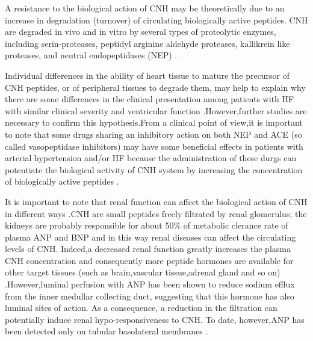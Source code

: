 \documentclass[14pt,a4paper,onecolumn]{extarticle}
\begin{document}
A resistance to the biological action of CNH may be theoretically due to an increase in degradation (turnover) of circulating biologically active peptides. CNH are degraded in vivo and in vitro by several types of proteolytic enzymes, including serin-proteases, peptidyl arginine aldehyde proteases, kallikrein like proteases, and neutral endopeptidases (NEP) \citep{bib35} \citep{bib36} \citep{bib318} \citep{bib3131} \citep{bib335} \citep{bib336} \citep{bib337} \citep{bib338}.

Individual differences in the ability of heart tissue to mature the precursor of CNH peptides, or of peripheral tissues to degrade them, may help to explain why there are some differences in the clinical presentation among patients with HF with similar clinical severity and ventricular function \citep{bib36}.However,further studies are necessary to confirm this hypothesis.From a clinical point of view,it is important to note that some drugs sharing an inhibitory action on both NEP and ACE (so called vasopeptidase inhibitors) may have some beneficial effects in patients with arterial hypertension and/or HF because the administration of these durgs can potentiate the biological activity of CNH system by increasing the concentration of biologically active peptides \citep{bib339} \citep{bib340} \citep{bib341} \citep{bib342}.

It is important to note that renal function can affect the biological action of CNH in different ways .CNH are small peptides freely filtrated by renal glomerulus; the kidneys are probably responsible for about 50\% of metabolic clerance rate of plasma ANP and BNP and in this way renal diseases can affect the circulating levels of CNH.  Indeed,a decreased renal function greatly increases the plasma CNH concentration and consequently more peptide hormones are available for other target tissues (such as brain,vascular tissue,adrenal gland and so on) \citep{bib35}.However,luminal perfusion with ANP has been shown to reduce sodium efflux from the inner medullar collecting duct, suggesting that this hormone has also luminal sites of action.  As a consequence, a reduction in the filtration can potentially induce renal hypo-responsiveness to CNH. To date, however,ANP has been detected only on tubular basolateral membranes \citep{bib325}. %
\end{document}
